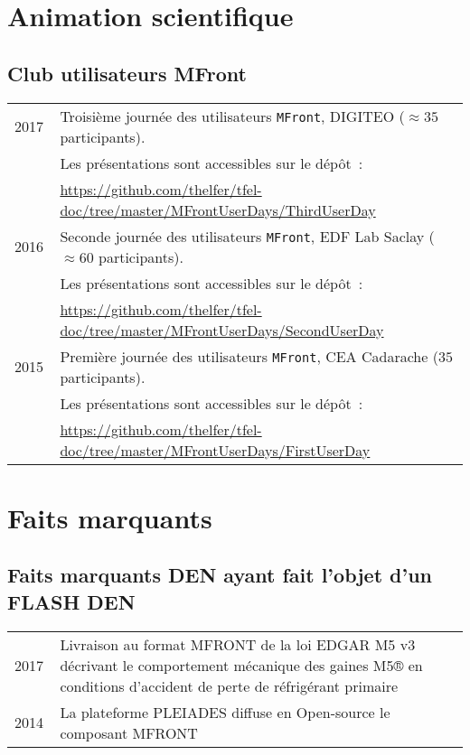 \documentclass[11pt,a4paper]{moderncv}
\let\origsubsection\subsection%
\let\subsection\section%
\let\subsection\origsubsection%
\begin{document}
\section{Animation scientifique}

\subsection{Club utilisateurs MFront}

\begin{tabular}[htbp]{p{0.1\linewidth}p{0.9\linewidth}}
  2017 &Troisième journée des utilisateurs \texttt{MFront}, DIGITEO (\(\approx{}35\) participants). \\
  & Les présentations sont accessibles sur le dépôt~: \\
  & \url{https://github.com/thelfer/tfel-doc/tree/master/MFrontUserDays/ThirdUserDay}\\
  2016 &Seconde journée des utilisateurs \texttt{MFront}, EDF Lab Saclay (\(\approx{}60\) participants). \\
  & Les présentations sont accessibles sur le dépôt~: \\
  & \url{https://github.com/thelfer/tfel-doc/tree/master/MFrontUserDays/SecondUserDay}\\
  2015 &Première journée des utilisateurs \texttt{MFront}, CEA Cadarache (\(35\) participants). \\
  & Les présentations sont accessibles sur le dépôt~: \\
  & \url{https://github.com/thelfer/tfel-doc/tree/master/MFrontUserDays/FirstUserDay}\\
\end{tabular}

\section{Faits marquants}

\subsection{Faits marquants DEN ayant fait l'objet d'un FLASH DEN}

\begin{tabular}[htbp]{p{0.1\linewidth}p{0.9\linewidth}}
  2017 &	Livraison au format MFRONT de la loi EDGAR M5 v3 décrivant le comportement mécanique des gaines M5® en conditions d’accident de perte de réfrigérant primaire \\
         
  2014 &	La plateforme PLEIADES diffuse en Open-source le composant MFRONT \\
\end{tabular}
\end{document}
